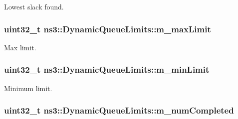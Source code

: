 Lowest slack found. 

\subsubsection[{\texorpdfstring{m\+\_\+max\+Limit}{m_maxLimit}}]{\setlength{\rightskip}{0pt plus 5cm}uint32\+\_\+t ns3\+::\+Dynamic\+Queue\+Limits\+::m\+\_\+max\+Limit\hspace{0.3cm}{\ttfamily [private]}}\hypertarget{classns3_1_1DynamicQueueLimits_af4720582bb5b333dad967863d250e868}{}\label{classns3_1_1DynamicQueueLimits_af4720582bb5b333dad967863d250e868}


Max limit. 

\subsubsection[{\texorpdfstring{m\+\_\+min\+Limit}{m_minLimit}}]{\setlength{\rightskip}{0pt plus 5cm}uint32\+\_\+t ns3\+::\+Dynamic\+Queue\+Limits\+::m\+\_\+min\+Limit\hspace{0.3cm}{\ttfamily [private]}}\hypertarget{classns3_1_1DynamicQueueLimits_a6717698410fa64928d9c41108974ea66}{}\label{classns3_1_1DynamicQueueLimits_a6717698410fa64928d9c41108974ea66}


Minimum limit. 

\subsubsection[{\texorpdfstring{m\+\_\+num\+Completed}{m_numCompleted}}]{\setlength{\rightskip}{0pt plus 5cm}uint32\+\_\+t ns3\+::\+Dynamic\+Queue\+Limits\+::m\+\_\+num\+Completed\hspace{0.3cm}{\ttfamily [private]}}\hypertarget{classns3_1_1DynamicQueueLimits_a324eecdc6e60e01387b707d64caa117c}{}\label{classns3_1_1DynamicQueueLimits_a324eecdc6e60e01387b707d64caa117c}


